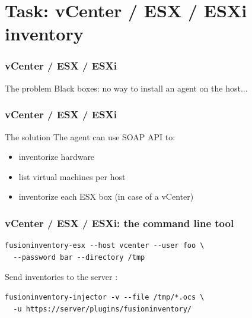 \documentclass{beamer}
\begin{document}
\section{Task: vCenter / ESX / ESXi inventory}


\begin{frame}
    \frametitle{vCenter / ESX / ESXi}

    \begin{block}{The problem}
    Black boxes: no way to install an agent on the host...
    \end{block}


\end{frame}

\begin{frame}
    \frametitle{vCenter / ESX / ESXi}

    \begin{block}{The solution}
    The agent can use SOAP API to:
        \begin{itemize}
                \item inventorize hardware
                \item list virtual machines per host
                \item inventorize each ESX box (in case of a vCenter)
        \end{itemize}
    \end{block}

\end{frame}

\begin{frame}[fragile]
    \frametitle{vCenter / ESX / ESXi: the command line tool}

\begin{lstlisting}
fusioninventory-esx --host vcenter --user foo \ 
  --password bar --directory /tmp
\end{lstlisting}

Send inventories to the server :
\begin{lstlisting}
fusioninventory-injector -v --file /tmp/*.ocs \ 
  -u https://server/plugins/fusioninventory/
\end{lstlisting}

\end{frame}
\end{document}
